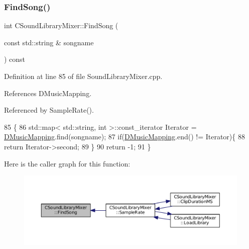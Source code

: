 \subsubsection{\texorpdfstring{Find\+Song()}{FindSong()}}
{\footnotesize\ttfamily int C\+Sound\+Library\+Mixer\+::\+Find\+Song (\begin{DoxyParamCaption}\item[{const std\+::string \&}]{songname }\end{DoxyParamCaption}) const}



Definition at line 85 of file Sound\+Library\+Mixer.\+cpp.



References D\+Music\+Mapping.



Referenced by Sample\+Rate().


\begin{DoxyCode}
85                                                                \{
86     std::map< std::string, int >::const\_iterator Iterator = \hyperlink{classCSoundLibraryMixer_ada2510450315651ebe948ce63960b98a}{DMusicMapping}.find(songname);
87     \textcolor{keywordflow}{if}(\hyperlink{classCSoundLibraryMixer_ada2510450315651ebe948ce63960b98a}{DMusicMapping}.end() != Iterator)\{
88         \textcolor{keywordflow}{return} Iterator->second;
89     \}
90     \textcolor{keywordflow}{return} -1;
91 \}
\end{DoxyCode}
Here is the caller graph for this function\+:\nopagebreak
\begin{figure}[H]
\begin{center}
\leavevmode
\includegraphics[width=350pt]{classCSoundLibraryMixer_a67d0364979fab26c2b2467357ec03696_icgraph}
\end{center}
\end{figure}
\hypertarget{classCSoundLibraryMixer_a9753684f44863e3c7cc4d319370cda1d}{}\label{classCSoundLibraryMixer_a9753684f44863e3c7cc4d319370cda1d} 
